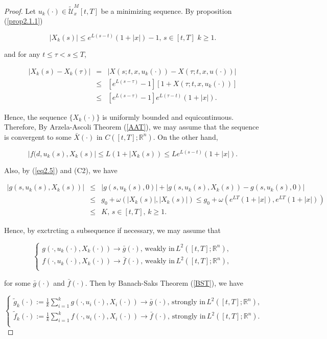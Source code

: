 \begin{proof}
Let $u_k(\cdot)\in\tilde{\mathcal{U}}^M_x[t,T]$ be a minimizing sequence. By 
proposition (\ref{prop2.1.1})

\begin{equation}\label{eq2.5}
|X_k(s)|\leq e^{L(s-t)}(1+|x|)-1,\,s\in [t,T]\,\,k\geq 1.
\end{equation}

and for any $t\leq \tau<s\leq T$,

\begin{eqnarray*}
|X_k(s)-X_k(\tau)|&=& |X(s;t,x,u_k(\cdot))-X(\tau;t,x,u(\cdot))|\\
&\leq& [e^{L(s-\tau)}-1][1+X(\tau;t,x,u_k(\cdot))]\\
&\leq& [e^{L(s-\tau)}-1]e^{L(\tau-t)}(1+|x|).
\end{eqnarray*}

Hence, the sequence $\{X_k(\cdot)\}$ is uniformly bounded and equicontinuous. 
Therefore, By Arzela-Ascoli Theorem (\ref{AAT}), we may assume that the 
sequence is convergent to some $\bar{X}(\cdot)$ in $C([t,T];\mathbb{R}^n)$. On 
the other hand,

$$|f(d,u_k(s),X_k(s)|\leq L(1+|X_k(s))\leq Le^{L(s-t)}(1+|x|).$$

Also, by (\ref{eq2.5}) and (C2), we have

\begin{eqnarray*}
|g(s,u_k(s),X_k(s))|&\leq& |g(s,u_k(s),0)|+|g(s,u_k(s),X_k(s))-g(s,u_k(s),0)|\\
&\leq& g_0+ \omega(|X_k(s)|,|X_k(s)|)\leq 
g_0+\omega(e^{LT}(1+|x|),e^{LT}(1+|x|))\\
&\leq& K,\,s\in [t,T],\,k\geq 1.
\end{eqnarray*}

Hence, by exctrcting a subsequence if necessary, we may assume that

$$\left\{ \begin{array}{l}
g(\cdot,u_k(\cdot),X_k(\cdot))\rightarrow \bar{g}(\cdot),\,\mbox{weakly in}\, 
L^2([t,T];\mathbb{R}^n), \\
f(\cdot,u_k(\cdot),X_k(\cdot))\rightarrow \bar{f}(\cdot),\,\mbox{weakly in}\, 
L^2([t,T];\mathbb{R}^n),\\
\end{array}
\right.$$

for some $\bar{g}(\cdot)$ and $\bar{f}(\cdot)$. Then by Banach-Saks Theorem 
(\ref{BST}), we have

\begin{equation}\label{eq2.6}
\left\{ \begin{array}{l}
\tilde{g}_k(\cdot):=\frac{1}{k}\sum_{i=1}^{k}g(\cdot,u_i(\cdot),X_i(\cdot))\rightarrow
 \bar{g}(\cdot),\,\mbox{strongly in}\, L^2([t,T];\mathbb{R}^n), \\
\tilde{f}_k(\cdot):=\frac{1}{k}\sum_{i=1}^{k}f(\cdot,u_i(\cdot),X_i(\cdot))\rightarrow
 \bar{f}(\cdot),\,\mbox{strongly in}\, L^2([t,T];\mathbb{R}^n).\\
\end{array}
\right.
\end{equation}


\end{proof}
